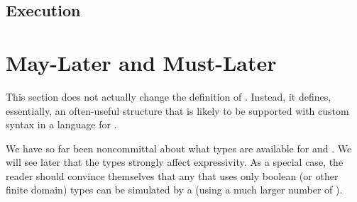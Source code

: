 \documentclass[12pt]{article}
\begin{document}
\subsection{Execution}


\section{May-Later and Must-Later}  \label{slater}

This section does not actually change the definition of \Contract. Instead, it defines, essentially, an often-useful \Contract structure that is likely to be supported with custom syntax in a language for \Contracts.

We have so far been noncommittal about what types are available for \GVars and \AParamsDomains. We will see later that the types strongly affect expressivity. As a special case, the reader should convince themselves that any \Contract that uses only boolean (or other finite domain) types can be simulated by a \FSContract (using a much larger number of \States).



\end{document}

